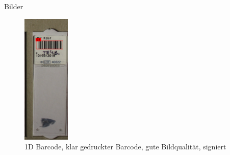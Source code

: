 \documentclass{beamer}
\begin{document}
\begin{frame}{Bilder}
\begin{figure}
      \includegraphics[width=0.2\textwidth]{./assets/Cell106357_2_8_top1_prosconsminweight.PNG}
      \caption{1D Barcode, klar gedruckter Barcode, gute Bildqualität, signiert}
    \end{figure}
  \end{frame}
\end{document}
